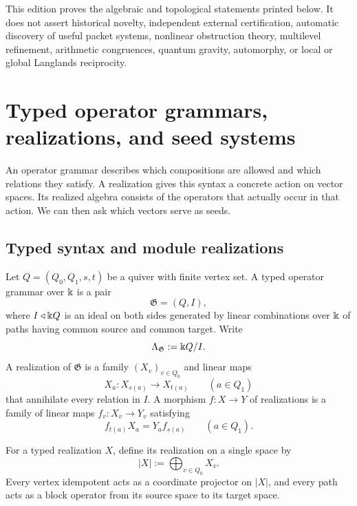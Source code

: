 \begin{boundary}
\label{bnd:symbolic-scope}
This edition proves the algebraic and topological statements printed below.  It does not assert historical novelty, independent external certification, automatic discovery of useful packet systems, nonlinear obstruction theory, multilevel refinement, arithmetic congruences, quantum gravity, automorphy, or local or global Langlands reciprocity.
\end{boundary}

\section{Typed operator grammars, realizations, and seed systems}
\begin{readerroadmap}
An operator grammar describes which compositions are allowed and which relations they satisfy.  A realization gives this syntax a concrete action on vector spaces.  Its realized algebra consists of the operators that actually occur in that action.  We can then ask which vectors serve as seeds.
\end{readerroadmap}
\subsection{Typed syntax and module realizations}

\begin{definition}
\label{def:typed-grammar}
Let $Q=(Q_0,Q_1,s,t)$ be a quiver with finite vertex set.  A typed operator grammar over $\Bbbk$ is a pair
\[
\mathfrak G=(Q,I),
\]
where $I\triangleleft \Bbbk Q$ is an ideal on both sides generated by linear combinations over $\Bbbk$ of paths having common source and common target.  Write
\[
\Lambda_{\mathfrak G}:=\Bbbk Q/I.
\]
A realization of $\mathfrak G$ is a family $(X_v)_{v\in Q_0}$ and linear maps
\[
X_a:X_{s(a)}\longrightarrow X_{t(a)}
\qquad(a\in Q_1)
\]
that annihilate every relation in $I$.  A morphism $f:X\to Y$ of realizations is a family of linear maps $f_v:X_v\to Y_v$ satisfying
\[
f_{t(a)}X_a=Y_af_{s(a)}
\qquad(a\in Q_1).
\]
\end{definition}

\begin{definition}
\label{def:collapsed-realization}
For a typed realization $X$, define its realization on a single space by
\[
|X|:=\bigoplus_{v\in Q_0}X_v.
\]
Every vertex idempotent acts as a coordinate projector on $|X|$, and every path acts as a block operator from its source space to its target space.
\end{definition}

